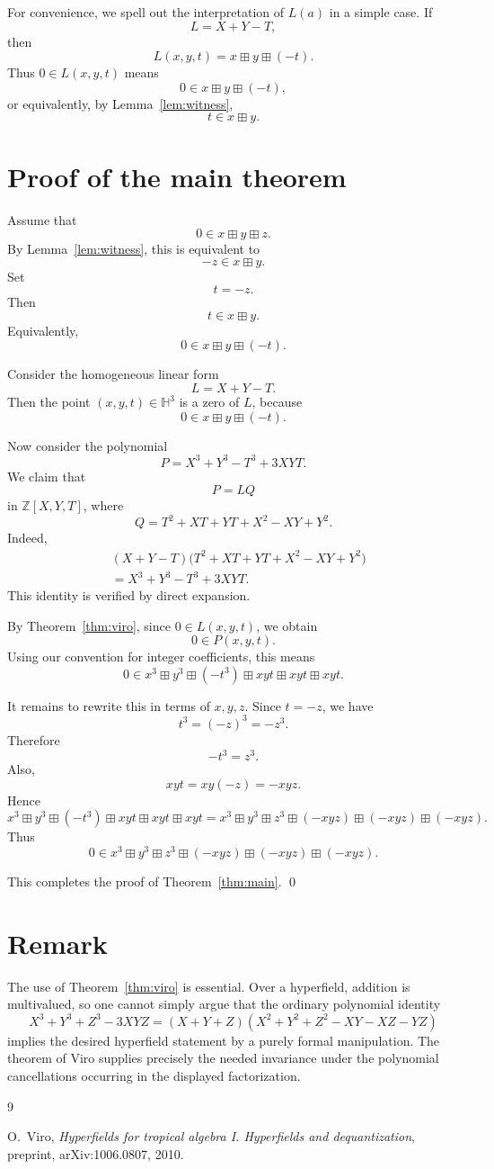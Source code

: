 For convenience, we spell out the interpretation of \(L(a)\) in a simple case. If
\[
L=X+Y-T,
\]
then
\[
L(x,y,t)=x\boxplus y\boxplus(-t).
\]
Thus \(0\in L(x,y,t)\) means
\[
0\in x\boxplus y\boxplus(-t),
\]
or equivalently, by Lemma~\ref{lem:witness},
\[
t\in x\boxplus y.
\]

\section{Proof of the main theorem}

Assume that
\[
0\in x\boxplus y\boxplus z.
\]
By Lemma~\ref{lem:witness}, this is equivalent to
\[
-z\in x\boxplus y.
\]
Set
\[
t=-z.
\]
Then
\[
t\in x\boxplus y.
\]
Equivalently,
\[
0\in x\boxplus y\boxplus(-t).
\]

Consider the homogeneous linear form
\[
L=X+Y-T.
\]
Then the point \((x,y,t)\in\mathbb H^3\) is a zero of \(L\), because
\[
0\in x\boxplus y\boxplus(-t).
\]

Now consider the polynomial
\[
P=X^{3}+Y^{3}-T^{3}+3XYT.
\]
We claim that
\[
P=LQ
\]
in \(\mathbb Z[X,Y,T]\), where
\[
Q=T^{2}+XT+YT+X^{2}-XY+Y^{2}.
\]
Indeed,
\[
\begin{aligned}
&(X+Y-T)\bigl(T^{2}+XT+YT+X^{2}-XY+Y^{2}\bigr)\\
&=X^{3}+Y^{3}-T^{3}+3XYT.
\end{aligned}
\]
This identity is verified by direct expansion.

By Theorem~\ref{thm:viro}, since \(0\in L(x,y,t)\), we obtain
\[
0\in P(x,y,t).
\]
Using our convention for integer coefficients, this means
\[
0\in x^{3}\boxplus y^{3}\boxplus(-t^{3})
\boxplus xyt\boxplus xyt\boxplus xyt.
\]

It remains to rewrite this in terms of \(x,y,z\). Since \(t=-z\), we have
\[
t^{3}=(-z)^{3}=-z^{3}.
\]
Therefore
\[
-t^{3}=z^{3}.
\]
Also,
\[
xyt=xy(-z)=-xyz.
\]
Hence
\[
x^{3}\boxplus y^{3}\boxplus(-t^{3})
\boxplus xyt\boxplus xyt\boxplus xyt
=
x^{3}\boxplus y^{3}\boxplus z^{3}
\boxplus(-xyz)\boxplus(-xyz)\boxplus(-xyz).
\]
Thus
\[
0\in x^{3}\boxplus y^{3}\boxplus z^{3}
\boxplus(-xyz)\boxplus(-xyz)\boxplus(-xyz).
\]

This completes the proof of Theorem~\ref{thm:main}. \qed

\section{Remark}

The use of Theorem~\ref{thm:viro} is essential. Over a hyperfield, addition is multivalued, so one cannot simply argue that the ordinary polynomial identity
\[
X^{3}+Y^{3}+Z^{3}-3XYZ
=
(X+Y+Z)(X^{2}+Y^{2}+Z^{2}-XY-XZ-YZ)
\]
implies the desired hyperfield statement by a purely formal manipulation. The theorem of Viro supplies precisely the needed invariance under the polynomial cancellations occurring in the displayed factorization.

\begin{thebibliography}{9}

O.~Viro,
\emph{Hyperfields for tropical algebra I. Hyperfields and dequantization},
preprint, arXiv:1006.0807, 2010.

\end{thebibliography}

